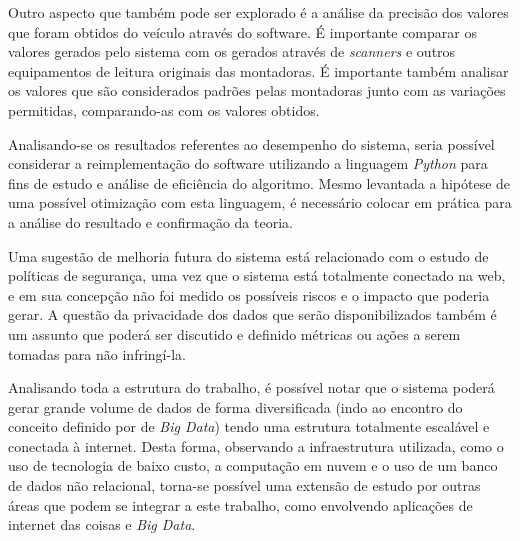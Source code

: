 Outro aspecto que também pode ser explorado é a análise da precisão dos valores que foram obtidos do veículo através do software. É importante comparar os valores gerados pelo sistema com os gerados através de \textit{scanners} e outros equipamentos de leitura originais das montadoras. É importante também analisar os valores que são considerados padrões pelas montadoras junto com as variações permitidas, comparando-as com os valores obtidos.

Analisando-se os resultados referentes ao desempenho do sistema, seria possível considerar a reimplementação do software utilizando a linguagem \textit{Python} para fins de estudo e análise de eficiência do algoritmo. Mesmo levantada a hipótese de uma possível otimização com esta linguagem, é necessário colocar em prática para a análise do resultado e confirmação da teoria.

Uma sugestão de melhoria futura do sistema está relacionado com o estudo de políticas de segurança, uma vez que o sistema está totalmente conectado na web, e em sua concepção não foi medido os possíveis riscos e o impacto que poderia gerar. A questão da privacidade dos dados que serão disponibilizados também é um assunto que poderá ser discutido e definido métricas ou ações a serem tomadas para não infringí-la.

Analisando toda a estrutura do trabalho, é possível notar que o sistema poderá gerar grande volume de dados de forma diversificada (indo ao encontro do conceito definido por \citeauthor{chede} de \textit{Big Data}) tendo uma estrutura totalmente escalável e conectada à internet. Desta forma, observando a infraestrutura utilizada, como o uso de tecnologia de baixo custo, a computação em nuvem e o uso de um banco de dados não relacional, torna-se possível uma extensão de estudo por outras áreas que podem se integrar a este trabalho, como envolvendo aplicações de internet das coisas e \textit{Big Data}.
